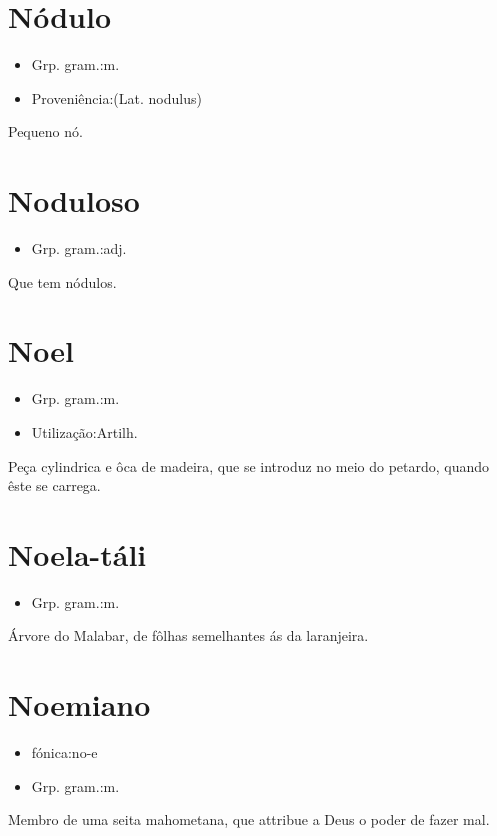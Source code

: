 \section{Nódulo}
\begin{itemize}
\item {Grp. gram.:m.}
\end{itemize}
\begin{itemize}
\item {Proveniência:(Lat. \textunderscore nodulus\textunderscore )}
\end{itemize}
Pequeno nó.
\section{Noduloso}
\begin{itemize}
\item {Grp. gram.:adj.}
\end{itemize}
Que tem nódulos.
\section{Noel}
\begin{itemize}
\item {Grp. gram.:m.}
\end{itemize}
\begin{itemize}
\item {Utilização:Artilh.}
\end{itemize}
Peça cylindrica e ôca de madeira, que se introduz no meio do petardo, quando êste se carrega.
\section{Noela-táli}
\begin{itemize}
\item {Grp. gram.:m.}
\end{itemize}
Árvore do Malabar, de fôlhas semelhantes ás da laranjeira.
\section{Noemiano}
\begin{itemize}
\item {fónica:no-e}
\end{itemize}
\begin{itemize}
\item {Grp. gram.:m.}
\end{itemize}
Membro de uma seita mahometana, que attribue a Deus o poder de fazer mal.
